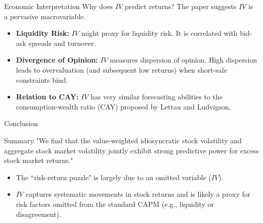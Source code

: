 \documentclass{beamer}
\begin{document}
\begin{frame}{Economic Interpretation}
    Why does $IV$ predict returns?  The paper suggests $IV$ is a pervasive macrovariable.

    \begin{itemize}
        \item \textbf{Liquidity Risk:} $IV$ might proxy for liquidity risk.  It is correlated with bid-ask spreads and turnover.
        \item \textbf{Divergence of Opinion:} $IV$ measures dispersion of opinion.  High dispersion leads to overvaluation (and subsequent low returns) when short-sale constraints bind.
         \item \textbf{Relation to CAY:} $IV$ has very similar forecasting abilities to the consumption-wealth ratio (CAY) proposed by Lettau and Ludvigson.
    \end{itemize}
\end{frame}

\begin{frame}{Conclusion}
    \begin{block}{Summary}
         "We find that the value-weighted idiosyncratic stock volatility and aggregate stock market volatility jointly exhibit strong predictive power for excess stock market returns." 
    \end{block}

    \vspace{0.5cm}
    \begin{itemize}
        \item The ``risk-return puzzle" is largely due to an omitted variable ($IV$).
         \item $IV$ captures systematic movements in stock returns and is likely a proxy for risk factors omitted from the standard CAPM (e.g., liquidity or disagreement).
    \end{itemize}
\end{frame}
\end{document}
